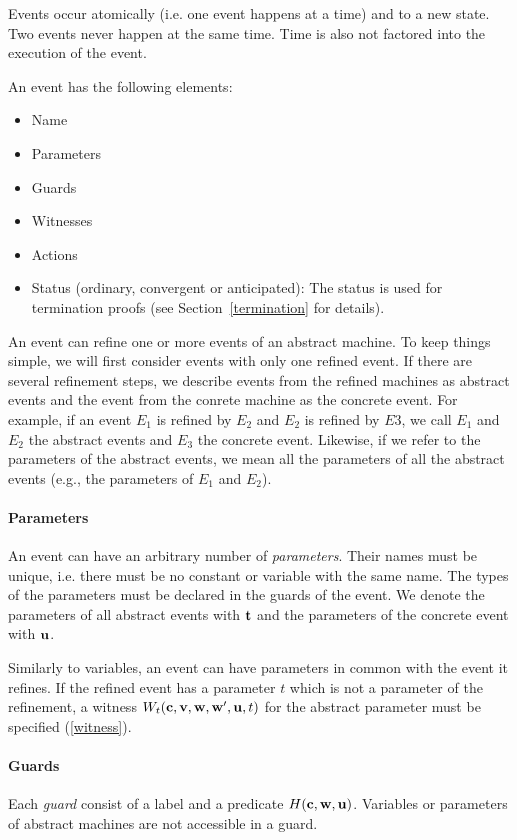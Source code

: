Events occur atomically (i.e. one event happens at a time) and to a new state.
Two events never happen at the same time. Time is also not factored into the execution of the event.

An event has the following elements:
\begin{itemize}
\item Name
\item Parameters
\item Guards
\item Witnesses
\item Actions
\item Status (ordinary, convergent or anticipated): The status is used
  for termination proofs (see Section~\ref{termination} for details).
\end{itemize}

An event can refine one or more events of an abstract machine. To keep things simple, we will
  first consider events with only one refined event.
If there are several refinement steps, we describe events from the refined machines as abstract events and the event from the conrete machine as the concrete event. For example, if an event $E_1$ is refined by $E_2$ and $E_2$ is refined by
  $E3$, we call $E_1$ and $E_2$ the abstract events and $E_3$ the concrete event.
Likewise, if we refer to the parameters of the abstract events, we mean all the parameters
  of all the abstract events (e.g., the parameters of $E_1$ and $E_2$).

\paragraph{Parameters}
\label{parameters}
An event can have an arbitrary number of \emph{parameters}. Their names must be unique, i.e. there must be no constant or variable with the same name.
The types of the parameters must be declared in the guards of the event.
We denote the parameters of all abstract events with $\mathbf{t}$ and the
parameters of the concrete event with $\mathbf{u}$.

Similarly to variables, an event can have parameters in common with the event it refines.
If the refined event has a parameter $t$ which is not a parameter of the refinement, 
 a witness $W_t(\mathbf{c},{\mathbf{v},\mathbf{w}},\mathbf{w}',\mathbf{u},t)$ for
 the abstract parameter must be specified (\ref{witness}).

\paragraph{Guards}
\label{guards}
Each \emph{guard} consist of a label and a predicate $H(\mathbf{c},\mathbf{w},\mathbf{u})$.
Variables or parameters of abstract machines are not accessible in a guard.

